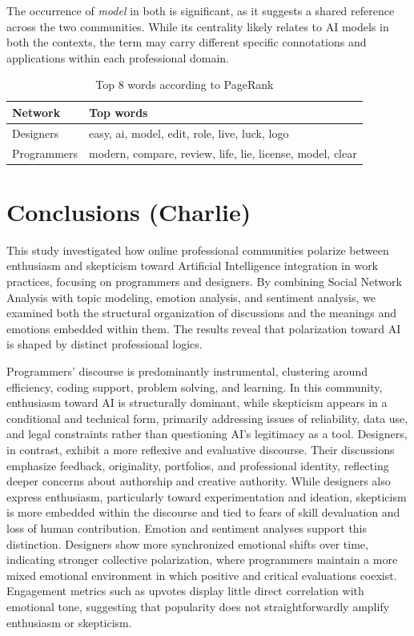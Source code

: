 \documentclass[conference]{IEEEtran}
\begin{document}
The occurrence of \textit{model} in both is significant, as it suggests a shared reference across the two communities. While its centrality likely relates to AI models in both the contexts, the term may carry different specific connotations and applications within each professional domain.
\begin{table}[H]
    \centering
    \caption{Top 8 words according to PageRank}
    \begin{tabular}{l l}
        \hline
        Network & Top words \\
        \hline
        Designers & easy, ai, model, edit, role, live, luck, logo \\
        Programmers & modern, compare, review, life, lie, license, model, clear \\
        \hline
    \end{tabular}
\end{table}

\section{Conclusions (Charlie)}
This study investigated how online professional communities polarize between enthusiasm and skepticism toward Artificial Intelligence integration in work practices, focusing on programmers and designers. By combining Social Network Analysis with topic modeling, emotion analysis, and sentiment analysis, we examined both the structural organization of discussions and the meanings and emotions embedded within them. The results reveal that polarization toward AI is shaped by distinct professional logics.

Programmers’ discourse is predominantly instrumental, clustering around efficiency, coding support, problem solving, and learning. In this community, enthusiasm toward AI is structurally dominant, while skepticism appears in a conditional and technical form, primarily addressing issues of reliability, data use, and legal constraints rather than questioning AI’s legitimacy as a tool. Designers, in contrast, exhibit a more reflexive and evaluative discourse. Their discussions emphasize feedback, originality, portfolios, and professional identity, reflecting deeper concerns about authorship and creative authority. While designers also express enthusiasm, particularly toward experimentation and ideation, skepticism is more embedded within the discourse and tied to fears of skill devaluation and loss of human contribution. Emotion and sentiment analyses support this distinction. Designers show more synchronized emotional shifts over time, indicating stronger collective polarization, where programmers maintain a more mixed emotional environment in which positive and critical evaluations coexist. Engagement metrics such as upvotes display little direct correlation with emotional tone, suggesting that popularity does not straightforwardly amplify enthusiasm or skepticism.
\end{document}
